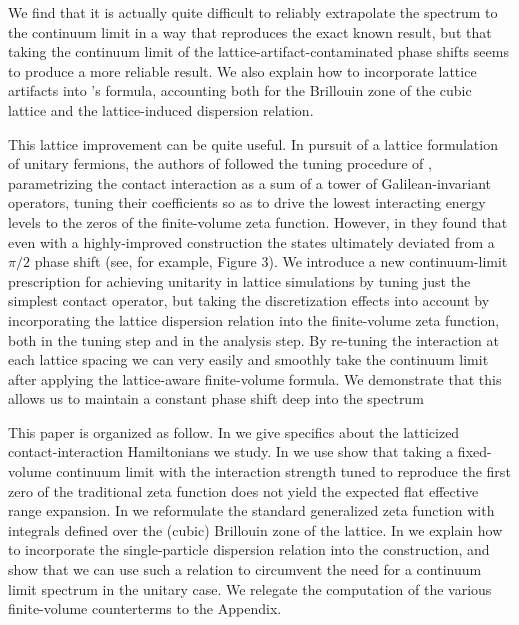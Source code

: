 We find that it is actually quite difficult to reliably extrapolate the spectrum to the continuum limit in a way that reproduces the exact known result, but that taking the continuum limit of the lattice-artifact-contaminated phase shifts seems to produce a more reliable result.
We also explain how to incorporate lattice artifacts into \Luscher's formula, accounting both for the Brillouin zone of the cubic lattice and the lattice-induced dispersion relation.

This lattice improvement can be quite useful.
In pursuit of a lattice formulation of unitary fermions, the authors of  followed the tuning procedure of , parametrizing the contact interaction as a sum of a tower of Galilean-invariant operators, tuning their coefficients so as to drive the lowest interacting energy levels to the zeros of the \Luscher finite-volume zeta function.
However, in  they found that even with a highly-improved construction the states ultimately deviated from a $\pi/2$ phase shift (see, for example, Figure 3).
We introduce a new continuum-limit prescription for achieving unitarity in lattice simulations by tuning just the simplest contact operator, but taking the discretization effects into account by incorporating the lattice dispersion relation into the finite-volume zeta function, both in the tuning step and in the analysis step.
By re-tuning the interaction at each lattice spacing we can very easily and smoothly take the continuum limit after applying the lattice-aware finite-volume formula.
We demonstrate that this allows us to maintain a constant phase shift deep into the spectrum

This paper is organized as follow.  In  we give specifics about the latticized contact-interaction Hamiltonians we study.  In  we use show that taking a fixed-volume continuum limit with the interaction strength tuned to reproduce the first zero of the traditional zeta function does not yield the expected flat effective range expansion.  In  we reformulate the standard generalized zeta function with integrals defined over the (cubic) Brillouin zone of the lattice.
In  we explain how to incorporate the single-particle dispersion relation into the \Luscher construction, and show that we can use such a relation to circumvent the need for a continuum limit spectrum in the unitary case.
We relegate the computation of the various finite-volume counterterms to the Appendix.
